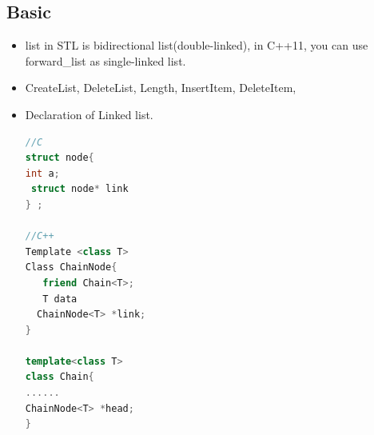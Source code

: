 \documentclass[a4paper,12pt,twoside]{book}
\begin{document}
\subsection{Basic}
\begin{itemize}
\item list in STL is bidirectional list(double-linked), in C++11, you can use forward\_list as single-linked list. 

\item CreateList, DeleteList, Length, InsertItem, DeleteItem, 
\item  Declaration of Linked list. 
\begin{lstlisting}[frame=single, language=c++]
//C 
struct node{ 
int a; 
 struct node* link
} ;

//C++
Template <class T>
Class ChainNode{
   friend Chain<T>;
   T data
  ChainNode<T> *link;
}

template<class T>
class Chain{
......
ChainNode<T> *head;
}
\end{lstlisting}
\end{itemize}
\end{document}
